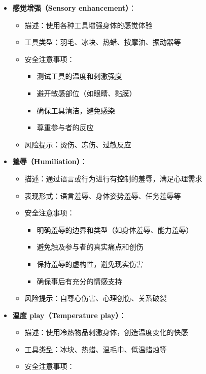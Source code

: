 \documentclass[12pt,UTF8]{ctexbook}
\begin{document}
\begin{itemize}
\begin{itemize}
\begin{itemize}
      \item 确保参与者可以随时沟通
      \end{itemize}
    \item 风险提示：焦虑、恐慌、迷失方向
    \end{itemize}
  \item \textbf{感觉增强（Sensory enhancement）}：
    \begin{itemize}
    \item 描述：使用各种工具增强身体的感觉体验
    \item 工具类型：羽毛、冰块、热蜡、按摩油、振动器等
    \item 安全注意事项：
      \begin{itemize}
      \item 测试工具的温度和刺激强度
      \item 避开敏感部位（如眼睛、黏膜）
      \item 确保工具清洁，避免感染
      \item 尊重参与者的反应
      \end{itemize}
    \item 风险提示：烫伤、冻伤、过敏反应
    \end{itemize}
  \item \textbf{羞辱（Humiliation）}：
    \begin{itemize}
    \item 描述：通过语言或行为进行有控制的羞辱，满足心理需求
    \item 表现形式：语言羞辱、身体姿势羞辱、任务羞辱等
    \item 安全注意事项：
      \begin{itemize}
      \item 明确羞辱的边界和类型（如身体羞辱、能力羞辱）
      \item 避免触及参与者的真实痛点和创伤
      \item 保持羞辱的虚构性，避免现实伤害
      \item 确保事后有充分的情感支持
      \end{itemize}
    \item 风险提示：自尊心伤害、心理创伤、关系破裂
    \end{itemize}
  \item \textbf{温度 play（Temperature play）}：
    \begin{itemize}
    \item 描述：使用冷热物品刺激身体，创造温度变化的快感
    \item 工具类型：冰块、热蜡、温毛巾、低温蜡烛等
    \item 安全注意事项：

\end{itemize}
\end{itemize}
\end{document}

